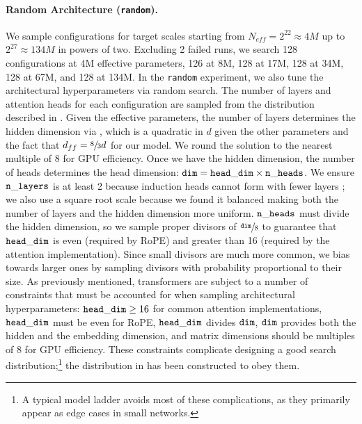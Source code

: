 \paragraph{Random Architecture (\texttt{random}).} We sample configurations for target scales starting from $N_{eff} = 2^{22} \approx 4M$ up to $2^{27} \approx 134M$ in powers of two. Excluding 2 failed runs, we search 128 configurations at 4M effective parameters, 126 at 8M, 128 at 17M, 128 at 34M, 128 at 67M, and 128 at 134M. In the \texttt{random} experiment, we also tune the architectural hyperparameters via random search. The number of layers and attention heads for each configuration are sampled from the distribution described in . Given the effective parameters, the number of layers determines the hidden dimension via , which is a quadratic in $d$ given the other parameters and the fact that $d_{ff} = \sfrac{8}{3} d$ for our model. We round the solution to the nearest multiple of 8 for GPU efficiency. Once we have the hidden dimension, the number of heads determines the head dimension: $\mathtt{dim} = \mathtt{head\_dim} \times \mathtt{n\_heads}$. We ensure $\mathtt{n\_layers}$ is at least 2 because induction heads cannot form with fewer layers \citep{olsson2022incontextlearninginductionheads}; we also use a square root scale because we found it balanced making both the number of layers and the hidden dimension more uniform. $\mathtt{n\_heads}$ must divide the hidden dimension, so we sample proper divisors of $\sfrac{\mathtt{dim}}{8}$ to guarantee that $\mathtt{head\_dim}$ is even (required by RoPE) and greater than 16 (required by the attention implementation). Since small divisors are much more common, we bias towards larger ones by sampling divisors with probability proportional to their size. As previously mentioned, transformers are subject to a number of constraints that must be accounted for when sampling architectural hyperparameters: $\mathtt{head\_dim} \geq 16$ for common attention implementations, $\mathtt{head\_dim}$ must be even for RoPE, $\mathtt{head\_dim}$ divides $\mathtt{dim}$, $\mathtt{dim}$ provides both the hidden and the embedding dimension, and matrix dimensions should be multiples of 8 for GPU efficiency. These constraints complicate designing a good search distribution;\footnote{
    A typical model ladder avoids most of these complications, as they primarily appear as edge cases in small networks.
} the distribution in  has been constructed to obey them.

